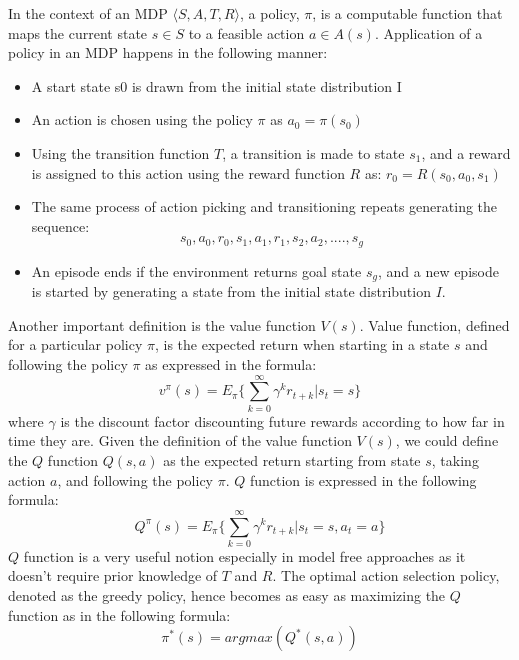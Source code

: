 In the context of an MDP \(\langle S, A, T, R \rangle\), a policy, \(\pi\), is a computable function that maps the current state \(s \in S\) to a feasible action \(a \in A(s)\). Application of a policy in an MDP happens in the following manner:
\begin{itemize}
    \item A start state s0 is drawn from the initial state distribution I
    \item An action is chosen using the policy \(\pi\) as \(a_0 = \pi(s_0)\)
    \item Using the transition function \(T\), a transition is made to state \(s_1\), and a reward is  assigned to this action using the reward function \(R\) as:  \(r_0 = R(s_0,a_0,s_1)\)
    \item The same process of action picking and transitioning repeats generating the sequence: 
    \begin{equation}
        s_0, a_0, r_0, s_1, a_1, r_1, s_2, a_2, ...., s_g
    \end{equation} 
    \item An episode ends if the environment returns goal state \(s_g\), and a new episode is started by generating a state from the initial state distribution \(I\).
\end{itemize}
Another important definition is the value function \(V(s)\). Value function, defined for a particular policy \(\pi\), is the expected return when starting in a state \(s\) and following the policy \(\pi\) as expressed in the formula:\begin{equation}
    v^{\pi}(s)=E_{\pi}\Big\{{\sum_{k=0}^{\infty}\gamma^{k}r_{t+k}|s_t=s}\Big\} 
\end{equation} 
where \(\gamma\) is the discount factor discounting future rewards according to how far in time they are.
Given the definition of the value function \(V(s)\), we could define the \(Q\) function \(Q(s,a)\) as the expected return starting from state \(s\), taking action \(a\), and following the policy \(\pi\). \(Q\) function is expressed in the following formula: \begin{equation}
    Q^{\pi}(s)=E_{\pi}\Big\{{\sum_{k=0}^{\infty}\gamma^{k}r_{t+k}|s_t=s,a_t=a}\Big\} 
\end{equation}
\(Q\) function is a very useful notion especially in model free approaches as it doesn’t require prior knowledge of \(T\) and \(R\). The optimal action selection policy, denoted as the greedy policy, hence becomes as easy  as maximizing the \(Q\) function as in the following formula:\begin{equation}
    \pi^*(s)=argmax(Q^*(s,a))
\end{equation}



